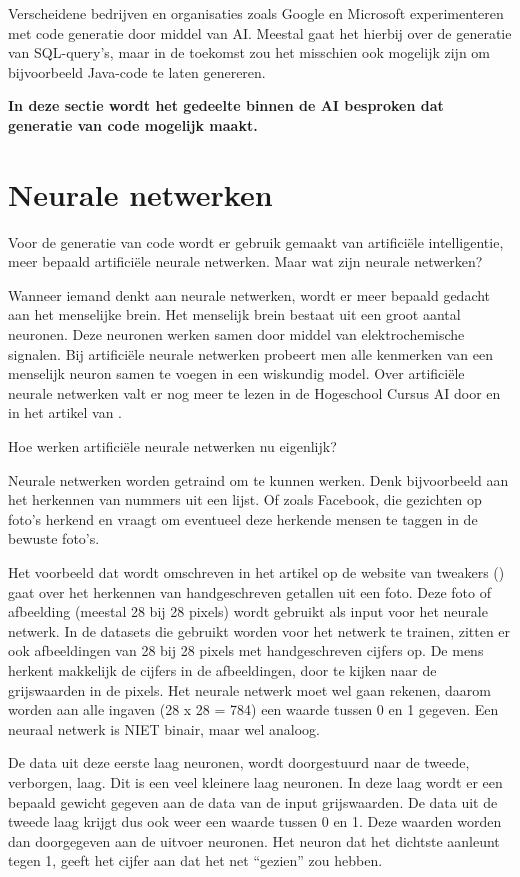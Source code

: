 Verscheidene bedrijven en organisaties zoals Google en Microsoft experimenteren met code generatie door middel van AI. Meestal gaat het hierbij over de generatie van SQL-query's, maar in de toekomst zou het misschien ook mogelijk zijn om bijvoorbeeld Java-code te laten genereren. 

\textbf{In deze sectie wordt het gedeelte binnen de AI besproken dat generatie van code mogelijk maakt.}
\section{Neurale netwerken}

Voor de generatie van code wordt er gebruik gemaakt van artificiële intelligentie, meer bepaald artificiële neurale netwerken. Maar wat zijn neurale netwerken? 

Wanneer iemand denkt aan neurale netwerken, wordt er meer bepaald gedacht aan het menselijke brein. Het menselijk brein bestaat uit een groot aantal neuronen. Deze neuronen werken samen door middel van elektrochemische signalen. Bij artificiële neurale netwerken probeert men alle kenmerken van een menselijk neuron samen te voegen in een wiskundig model. Over artificiële neurale netwerken valt er nog meer te lezen in de Hogeschool Cursus AI door \textcite{cursusAI} en in het artikel van \textcite{techpulse}.

Hoe werken artificiële neurale netwerken nu eigenlijk? 

Neurale netwerken worden getraind om te kunnen werken. Denk bijvoorbeeld aan het herkennen van nummers uit een lijst. Of zoals Facebook, die gezichten op foto’s herkend en vraagt om eventueel deze herkende mensen te taggen in de bewuste foto’s. 

Het voorbeeld dat wordt omschreven in het artikel op de website van tweakers (\textcite{tweakers}) gaat over het herkennen van handgeschreven getallen uit een foto. Deze foto of afbeelding (meestal 28 bij 28 pixels) wordt gebruikt als input voor het neurale netwerk. In de datasets die gebruikt worden voor het netwerk te trainen, zitten er ook afbeeldingen van 28 bij 28 pixels met handgeschreven cijfers op. De mens herkent makkelijk de cijfers in de afbeeldingen, door te kijken naar de grijswaarden in de pixels. Het neurale netwerk moet wel gaan rekenen, daarom worden aan alle ingaven (28 x 28 = 784) een waarde tussen 0 en 1 gegeven. Een neuraal netwerk is NIET binair, maar wel analoog. 

De data uit deze eerste laag neuronen, wordt doorgestuurd naar de tweede, verborgen, laag. Dit is een veel kleinere laag neuronen. In deze laag wordt er een bepaald gewicht gegeven aan de data van de input grijswaarden. De data uit de tweede laag krijgt dus ook weer een waarde tussen 0 en 1. Deze waarden worden dan doorgegeven aan de uitvoer neuronen. Het neuron dat het dichtste aanleunt tegen 1, geeft het cijfer aan dat het net “gezien” zou hebben. 

